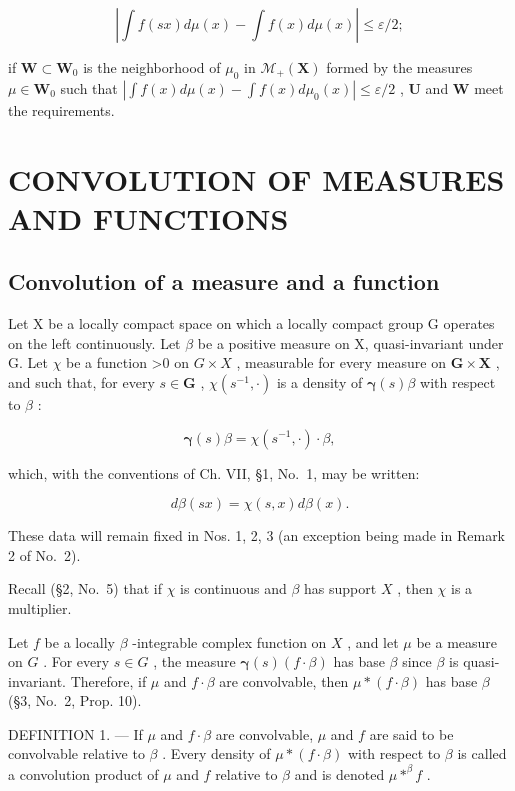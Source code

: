\[
\left| \int f (s x) d \mu (x) - \int f (x) d \mu (x) \right| \leqslant \varepsilon / 2;
\]

if \(\mathbf{W} \subset \mathbf{W}_0\) is the neighborhood of \(\mu_0\) in \(\mathcal{M}_{+}(\mathbf{X})\) formed by the measures \(\mu \in \mathbf{W}_0\) such that \(|\int f(x) d\mu(x) - \int f(x) d\mu_0(x)| \leqslant \varepsilon/2\) , \(\mathbf{U}\) and \(\mathbf{W}\) meet the requirements.

\section{CONVOLUTION OF MEASURES AND FUNCTIONS}

\subsection{Convolution of a measure and a function}

Let X be a locally compact space on which a locally compact group G operates on the left continuously. Let \(\beta\) be a positive measure on X, quasi-invariant under G. Let \(\chi\) be a function \textgreater0 on \(G \times X\) , measurable for every measure on \(\mathbf{G} \times \mathbf{X}\) , and such that, for every \(s \in \mathbf{G}\) , \(\chi(s^{-1}, \cdot)\) is a density of \(\pmb{\gamma}(s)\beta\) with respect to \(\beta\) :

\[
\pmb {\gamma} (s) \beta = \chi (s ^ {- 1}, \cdot) \cdot \beta ,\tag{1}
\]

which, with the conventions of Ch. VII, §1, No.~1, may be written:

\[
d \beta (s x) = \chi (s, x) d \beta (x).\tag{1'}
\]

These data will remain fixed in Nos. 1, 2, 3 (an exception being made in Remark 2 of No.~2).

Recall (§2, No.~5) that if \(\chi\) is continuous and \(\beta\) has support \(X\) , then \(\chi\) is a multiplier.

Let \(f\) be a locally \(\beta\) -integrable complex function on \(X\) , and let \(\mu\) be a measure on \(G\) . For every \(s \in G\) , the measure \(\boldsymbol{\gamma}(s)(f \cdot \beta)\) has base \(\beta\) since \(\beta\) is quasi-invariant. Therefore, if \(\mu\) and \(f \cdot \beta\) are convolvable, then \(\mu * (f \cdot \beta)\) has base \(\beta\) (§3, No.~2, Prop. 10).

DEFINITION 1. --- If \(\mu\) and \(f \cdot \beta\) are convolvable, \(\mu\) and \(f\) are said to be convolvable relative to \(\beta\) . Every density of \(\mu * (f \cdot \beta)\) with respect to \(\beta\) is called a convolution product of \(\mu\) and \(f\) relative to \(\beta\) and is denoted \(\mu * ^{\beta} f\) .

